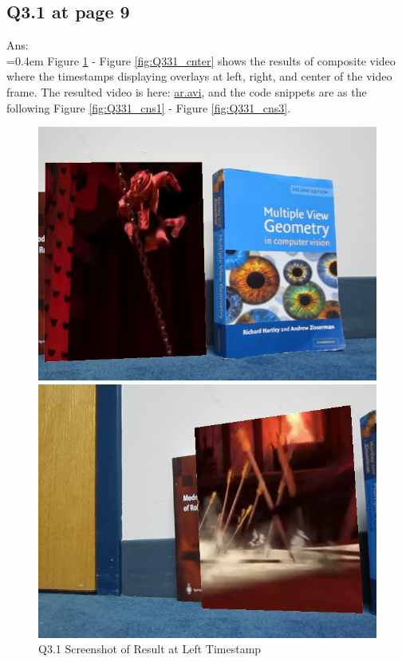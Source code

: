 \documentclass{article}
\begin{document}
	\newpage
	\subsection*{Q3.1 at page 9}
	Ans:\\
	\hangindent=0.4em \hspace{0.3em} Figure \ref{fig:Q331_left} - Figure \ref{fig:Q331_cnter} shows the results of composite video where the timestamps displaying overlays at left, right, and center of the video frame. The resulted video is here: \href{https://drive.google.com/file/d/1lg2Ez4O62NCa-MrrvyQUnXDzLBnftsAt/view?usp=sharing}{ar\@.avi}, and the code snippets are as the following Figure \ref{fig:Q331_cns1} - Figure \ref{fig:Q331_cns3}.
	\begin{figure}[H]
	\centering
	\begin{minipage}[b]{0.45\textwidth}
		\centering
		\includegraphics[width=\textwidth]{./result/Q3_1_ar_result_overlay_left.jpg}  %
		\caption{Q3.1 Screenshot of Result at Left Timestamp}
		\label{fig:Q331_left}
	\end{minipage}
	\hfill  %
	\begin{minipage}[b]{0.45\textwidth}
		\centering
		\includegraphics[width=\textwidth]{./result/Q3_1_ar_result_overlay_right.jpg}  %

\end{minipage}
\end{figure}
\end{document}

